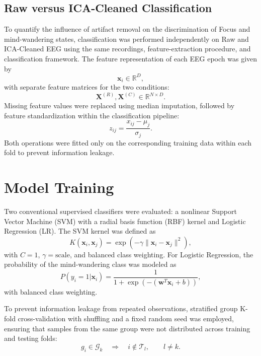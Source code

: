 \documentclass[conference]{IEEEtran}
\begin{document}
\subsection{Raw versus ICA-Cleaned Classification}
To quantify the influence of artifact removal on the discrimination of Focus and mind-wandering states, classification was performed independently on Raw and ICA-Cleaned EEG using the same recordings, feature-extraction procedure, and classification framework.
The feature representation of each EEG epoch was given by
\begin{equation}
\mathbf{x}_i \in \mathbb{R}^{D},
\end{equation}
with separate feature matrices for the two conditions:
\begin{equation}
\mathbf{X}^{(R)},\mathbf{X}^{(C)}
\in\mathbb{R}^{N\times D}.
\end{equation}
Missing feature values were replaced using median imputation, followed by feature standardization within the classification pipeline:
\begin{equation}
z_{ij}
=
\frac{x_{ij}-\mu_j}{\sigma_j}.
\end{equation}
Both operations were fitted only on the corresponding training data within each fold to prevent information leakage.

\section{Model Training}

Two conventional supervised classifiers were evaluated: a nonlinear Support Vector Machine (SVM) with a radial basis function (RBF) kernel and Logistic Regression (LR). The SVM kernel was defined as
\begin{equation}
K(\mathbf{x}_i,\mathbf{x}_j)
=
\exp\left(-\gamma
\|\mathbf{x}_i-\mathbf{x}_j\|^2\right),
\end{equation}
with $C=1$, $\gamma=\mathrm{scale}$, and balanced class weighting. For Logistic Regression, the probability of the mind-wandering class was modeled as
\begin{equation}
P(y_i=1|\mathbf{x}_i)
=
\frac{1}
{1+\exp(-(\mathbf{w}^{T}\mathbf{x}_i+b))},
\end{equation}
with balanced class weighting.

To prevent information leakage from repeated observations, stratified group K-fold cross-validation with shuffling and a fixed random seed was employed, ensuring that samples from the same group were not distributed across training and testing folds:
\begin{equation}
g_i\in\mathcal{G}_k
\quad\Rightarrow\quad
i\notin\mathcal{T}_l,\qquad l\neq k.
\end{equation}
\end{document}
